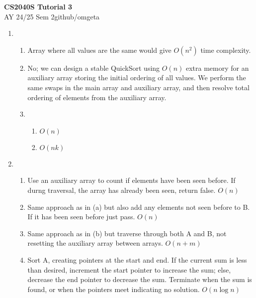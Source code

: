 \documentclass[12pt, a4paper]{article}
\newcommand{\mytitle}{CS2040S Tutorial 3}
\newcommand{\myauthor}{github/omgeta}
\newcommand{\mydate}{AY 24/25 Sem 2}
\begin{document}
\raggedright
\footnotesize
\begin{center}
{\normalsize{\textbf{\mytitle}}} \\
{\footnotesize{\mydate\hspace{2pt}\textemdash\hspace{2pt}\myauthor}}
\end{center}
\begin{enumerate}[Q\arabic*.]
  \item 
    \begin{enumerate}[(\alph*.)]
      \item  Array where all values are the same would give $O(n^2)$ time complexity.
      
      \item No; we can design a stable QuickSort using $O(n)$ extra memory for an auxiliary array storing the initial ordering of all values. We perform the same swaps in the main array and auxiliary array, and then resolve total ordering of elements from the auxiliary array.

      \item 
        \begin{enumerate}[(\roman*.)]
          \item $O(n)$
          \item $O(nk)$ 
        \end{enumerate}
    \end{enumerate}

  \item 
    \begin{enumerate}[(\alph*.)]
      \item Use an auxiliary array to count if elements have been seen before. If durng traversal, the array has already been seen, return false. $O(n)$

      \item Same approach as in (a) but also add any elements not seen before to B. If it has been seen before just pass. $O(n)$

      \item Same approach as in (b) but traverse through both A and B, not resetting the auxiliary array between arrays. $O(n+m)$

      \item Sort A, creating pointers at the start and end. If the current sum is less than desired, increment the start pointer to increase the sum; else, decrease the end pointer to decrease the sum. Terminate when the sum is found, or when the pointers meet indicating no solution. $O(n\log n)$
    \end{enumerate}


\end{enumerate}
\end{document}
